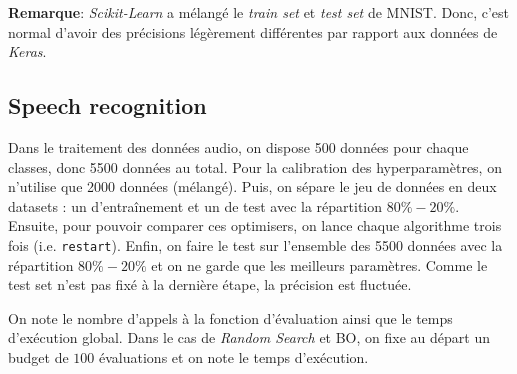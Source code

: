 \documentclass[12 pt, a4paper]{article}
\begin{document}
\textbf{Remarque}: \textit{Scikit-Learn} a mélangé le \emph{train set} et \emph{test set} de MNIST. Donc, c'est normal d'avoir des précisions légèrement différentes par rapport aux données de \textit{Keras}.

\subsection*{Speech recognition}




Dans le traitement des données audio, on dispose 500 données pour chaque classes, donc 5500 données au total. Pour la calibration des hyperparamètres, on n'utilise que 2000 données (mélangé). Puis, on sépare le jeu de données en deux datasets : un d'entraînement et un de test avec la répartition $80\%-20\%$. Ensuite, pour pouvoir comparer ces optimisers, on lance chaque algorithme trois fois (i.e. \texttt{restart}). Enfin, on faire le test sur l'ensemble des 5500 données avec la répartition $80\%-20\%$ et on ne garde que les meilleurs paramètres. Comme le test set n'est pas fixé à la dernière étape, la précision est fluctuée.

On note le nombre d'appels à la fonction d'évaluation ainsi que le temps d'exécution global. Dans le cas de \textit{Random Search} et BO, on fixe au départ un budget de $100$ évaluations et on note le temps d'exécution.
\end{document}
